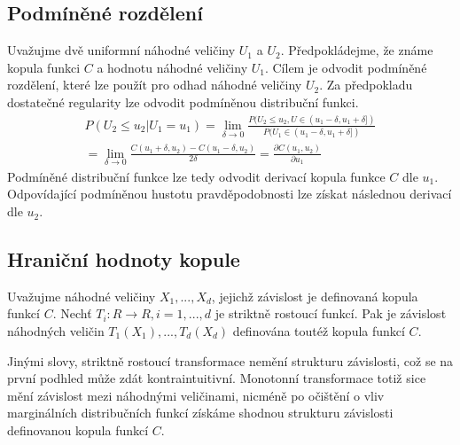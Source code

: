 \subsection{Podmíněné rozdělení}

Uvažujme dvě uniformní náhodné veličiny $U_1$ a $U_2$. Předpokládejme, že známe kopula funkci $C$ a hodnotu náhodné veličiny $U_1$. Cílem je odvodit podmíněné rozdělení, které lze použít pro odhad náhodné veličiny $U_2$. Za předpokladu dostatečné regularity lze odvodit podmíněnou distribuční funkci.
\begin{multline*}
P(U_2 \le u_2 | U_1 = u_1) = \lim_{\delta \rightarrow 0}\frac{P(U_2 \le u_2, U \in (u_1 - \delta, u_1 + \delta])}{P(U_1 \in (u_1 - \delta, u_1 + \delta])}\\
= \lim_{\delta \rightarrow 0}\frac{C(u_1 + \delta, u_2) - C(u_1 - \delta, u_2)}{2 \delta} = \frac{\partial C(u_1, u_2)}{\partial u_1}
\end{multline*}
Podmíněné distribuční funkce lze tedy odvodit derivací kopula funkce $C$ dle $u_1$. Odpovídající podmíněnou hustotu pravděpodobnosti lze získat následnou derivací dle $u_2$.

\subsection{Hraniční hodnoty kopule}

\begin{proposition}
Uvažujme náhodné veličiny $X_1, ..., X_d$, jejichž závislost je definovaná kopula funkcí $C$. Nechť $T_i: R \rightarrow R, i = 1, ..., d$ je striktně rostoucí funkcí. Pak je závislost náhodných veličin $T_1(X_1), ..., T_d(X_d)$ definována toutéž kopula funkcí $C$. 
\end{proposition}
Jinými slovy, striktně rostoucí transformace nemění strukturu závislosti, což se na první podhled může zdát kontraintuitivní. Monotonní transformace totiž sice mění závislost mezi náhodnými veličinami, nicméně po očištění o vliv marginálních distribučních funkcí získáme shodnou strukturu závislosti definovanou kopula funkcí $C$.

